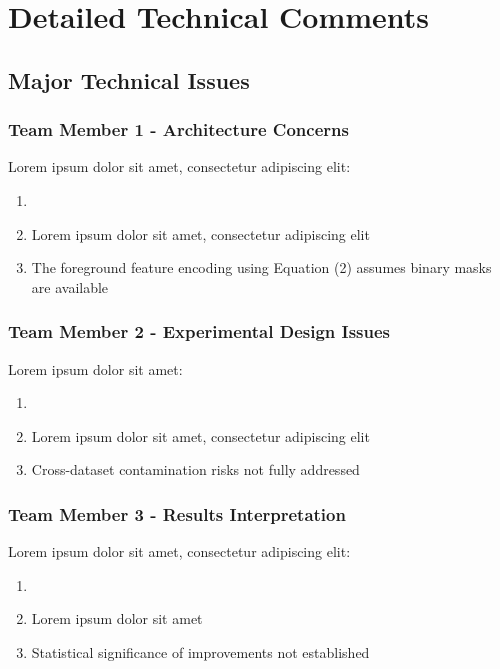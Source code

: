 \section{Detailed Technical Comments}
\label{sec:detailed_comments}

\subsection{Major Technical Issues}
\subsubsection{Team Member 1 - Architecture Concerns}
Lorem ipsum dolor sit amet, consectetur adipiscing elit:
\begin{enumerate}
    \item {}
    \item Lorem ipsum dolor sit amet, consectetur adipiscing elit
    \item The foreground feature encoding using Equation (2) assumes binary masks are available
\end{enumerate}

\subsubsection{Team Member 2 - Experimental Design Issues}
Lorem ipsum dolor sit amet:
\begin{enumerate}
    \item {}
    \item Lorem ipsum dolor sit amet, consectetur adipiscing elit
    \item Cross-dataset contamination risks not fully addressed
\end{enumerate}

\subsubsection{Team Member 3 - Results Interpretation}
Lorem ipsum dolor sit amet, consectetur adipiscing elit:
\begin{enumerate}
    \item {}
    \item Lorem ipsum dolor sit amet
    \item Statistical significance of improvements not established
\end{enumerate}

